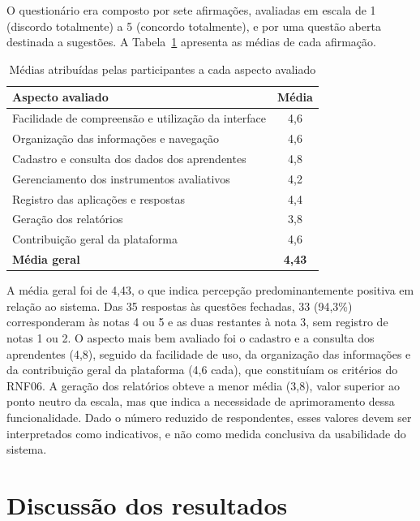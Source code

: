 O questionário era composto por sete afirmações, avaliadas em escala de 1 (discordo totalmente) a 5 (concordo totalmente), e por uma questão aberta destinada a sugestões. A Tabela~\ref{tab:medias_avaliacoes} apresenta as médias de cada afirmação.

\begin{table}[H]
\centering
\footnotesize
\caption{Médias atribuídas pelas participantes a cada aspecto avaliado}
\label{tab:medias_avaliacoes}
\begin{tabular}{p{10cm} c}
\hline
\textbf{Aspecto avaliado} & \textbf{Média} \\
\hline
Facilidade de compreensão e utilização da interface & 4,6 \\
Organização das informações e navegação & 4,6 \\
Cadastro e consulta dos dados dos aprendentes & 4,8 \\
Gerenciamento dos instrumentos avaliativos & 4,2 \\
Registro das aplicações e respostas & 4,4 \\
Geração dos relatórios & 3,8 \\
Contribuição geral da plataforma & 4,6 \\
\hline
\textbf{Média geral} & \textbf{4,43} \\
\hline
\end{tabular}
\end{table}

A média geral foi de 4,43, o que indica percepção predominantemente positiva em relação ao sistema. Das 35 respostas às questões fechadas, 33 (94,3\%) corresponderam às notas 4 ou 5 e as duas restantes à nota 3, sem registro de notas 1 ou 2. O aspecto mais bem avaliado foi o cadastro e a consulta dos aprendentes (4,8), seguido da facilidade de uso, da organização das informações e da contribuição geral da plataforma (4,6 cada), que constituíam os critérios do RNF06. A geração dos relatórios obteve a menor média (3,8), valor superior ao ponto neutro da escala, mas que indica a necessidade de aprimoramento dessa funcionalidade. Dado o número reduzido de respondentes, esses valores devem ser interpretados como indicativos, e não como medida conclusiva da usabilidade do sistema.

\section{Discussão dos resultados}\label{sec:discussao}

